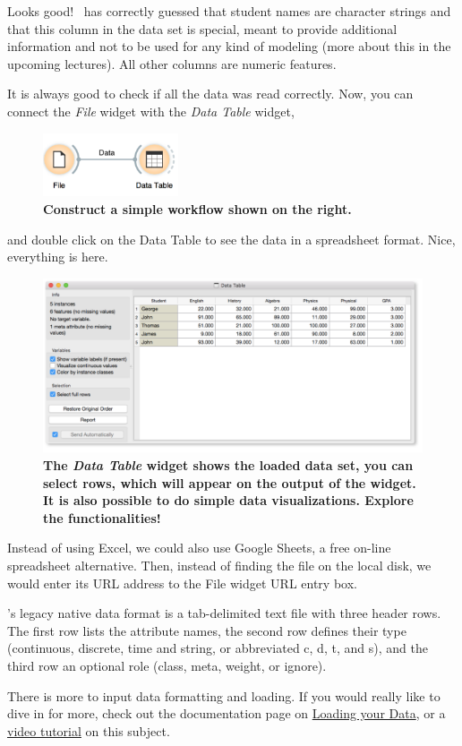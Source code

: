 Looks good! \mutation\ has correctly guessed that student names are character strings and that this column in the data set is special, meant to provide additional information and not to be used for any kind of modeling (more about this in the upcoming lectures). All other columns are numeric features.

It is always good to check if all the data was read correctly. Now, you can connect the \textit{File} widget with the \textit{Data Table} widget,

\begin{figure}[h]
  \centering
  \includegraphics[width=40mm]{loading-fig3.png}%
  \caption{\textbf{\textsf{Construct a simple workflow shown on the right.}}}
\label{fig:loading-fig3}
\end{figure}

\noindent and double click on the Data Table to see the data in a spreadsheet format.
Nice, everything is here. 

\begin{figure}[h]
  \centering
  \includegraphics[width=\linewidth]{loading-fig4.png}%
  \caption{\textbf{\textsf{The \textit{Data Table} widget shows the loaded data set, you can select rows, which will appear on the output of the widget. It is also possible to do simple data visualizations. Explore the functionalities!}}}
  \label{fig:loading-fig4}
\end{figure}

Instead of using Excel, we could also use Google Sheets, a free on-line spreadsheet alternative. Then, instead of finding the file on the local disk, we would enter its URL address to the File widget URL entry box.

\mutation’s legacy native data format is a tab-delimited text file with three header rows. The first row lists the attribute names, the second row defines their type (continuous, discrete, time and string, or abbreviated c, d, t, and s), and the third row an optional role (class, meta, weight, or ignore).

There is more to input data formatting and loading. If you would really like to dive in for more, check out the documentation page on \href{https://orange-visual-programming.readthedocs.io/loading-your-data/index.html}{Loading your Data}, or a \href{https://www.youtube.com/watch?v=MHcGdQeYCMg}{video tutorial} on this subject.
